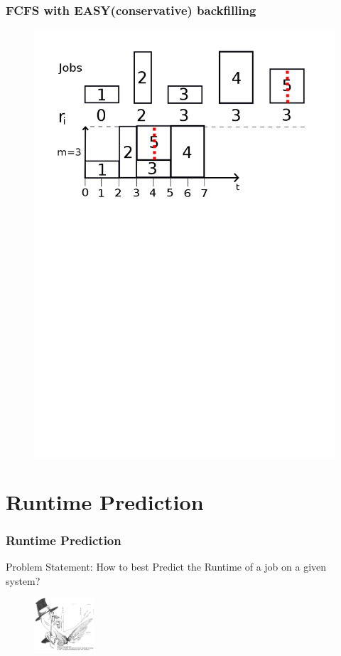 \documentclass{beamer}
\begin{document}
\begin{frame}
  \frametitle{FCFS with EASY(conservative) backfilling}
  \begin{figure}[H]
          \centering
          \includegraphics[width=\textwidth]{FCFSb.png}
          \caption{}
          \label{fig:fcfs_png}
  \end{figure}

\end{frame}


\section{Runtime Prediction}
\label{sec:runtime_prediction}
\begin{frame}
  \frametitle{Runtime Prediction}
  Problem Statement:
  How to best Predict the Runtime of a job on a given system?
  \begin{figure}[H]
          \centering
          \includegraphics[width=0.2\textwidth]{turkey.png}
          \label{fig:turkey_png}
  \end{figure}
\end{frame}
\end{document}

